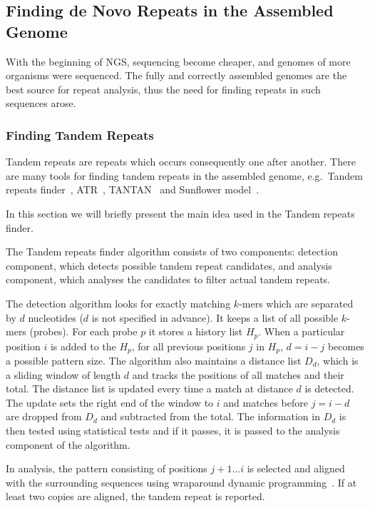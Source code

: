 \subsection{Finding de Novo Repeats in the Assembled Genome}

With the beginning of NGS, sequencing become cheaper, and genomes of more organisms were sequenced. The fully and correctly assembled genomes are the best source for repeat analysis, thus the need for finding repeats in such sequences arose.

\subsubsection{Finding Tandem Repeats}
Tandem repeats are repeats which occurs consequently one after another. There are many tools for finding tandem repeats in the assembled genome, e.g.\ Tandem repeats finder~\cite{trf}, ATR~\cite{atr}, TANTAN~\cite{tantan} and Sunflower model~\cite{nanasi2014probabilistic}.

In this section we will briefly present the main idea used in the Tandem repeats finder.

The Tandem repeats finder algorithm consists of two components: detection component, which detects possible tandem repeat candidates, and analysis component, which analyses the candidates to filter actual tandem repeats.

The detection algorithm looks for exactly matching $k$-mers which are separated by $d$ nucleotides ($d$ is not specified in advance). It keeps a list of all possible $k$-mers (probes).
For each probe $p$ it stores a history list $H_p$.
When a particular position $i$ is added to the $H_p$, for all previous positions $j$ in $H_p$, $d = i - j$ becomes a possible pattern size.
The algorithm also maintains a distance list $D_d$, which is a sliding window of length $d$ and tracks the positions of all matches and their total. The distance list is updated every time a match at distance $d$ is detected. The update sets the right end of the window to $i$ and matches before $j = i - d$ are dropped from $D_d$ and subtracted from the total. The information in $D_d$ is then tested using statistical tests and if it passes, it is passed to the analysis component of the algorithm.

In analysis, the pattern consisting of positions $j+1\dots i$ is selected and aligned with the surrounding sequences using wraparound dynamic programming~\cite{fischetti1992apostolico, myers1989approximate}. If at least two copies are aligned, the tandem repeat is reported.

